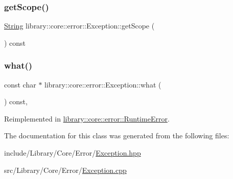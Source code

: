 \subsubsection{\texorpdfstring{getScope()}{getScope()}}
{\footnotesize\ttfamily \mbox{\hyperlink{classlibrary_1_1core_1_1types_1_1_string}{String}} library\+::core\+::error\+::\+Exception\+::get\+Scope (\begin{DoxyParamCaption}{ }\end{DoxyParamCaption}) const}

\mbox{\label{classlibrary_1_1core_1_1error_1_1_exception_ab318a927162519b15961ca66be07fd6b}} 
\subsubsection{\texorpdfstring{what()}{what()}}
{\footnotesize\ttfamily const char $\ast$ library\+::core\+::error\+::\+Exception\+::what (\begin{DoxyParamCaption}{ }\end{DoxyParamCaption}) const\hspace{0.3cm}{\ttfamily [virtual]}, {\ttfamily [noexcept]}}



Reimplemented in \mbox{\hyperlink{classlibrary_1_1core_1_1error_1_1_runtime_error_af3da31cf67f3f5e120c5db9072e3a801}{library\+::core\+::error\+::\+Runtime\+Error}}.



The documentation for this class was generated from the following files\+:\begin{DoxyCompactItemize}
\item 
include/\+Library/\+Core/\+Error/\mbox{\hyperlink{_exception_8hpp}{Exception.\+hpp}}\item 
src/\+Library/\+Core/\+Error/\mbox{\hyperlink{_exception_8cpp}{Exception.\+cpp}}\end{DoxyCompactItemize}
